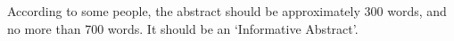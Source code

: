 \label{abstract}
According to some people, the abstract should be
approximately 300 words, and no more than 700 words. It should be an
`Informative Abstract'.
